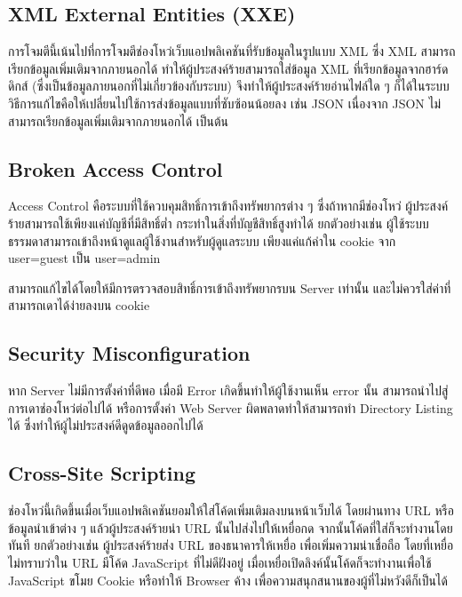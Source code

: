 \subsection{XML External Entities (XXE)}
การโจมตีนี้เน้นไปที่การโจมตีช่องโหว่เว็บแอปพลิเคชันที่รับข้อมูลในรูปแบบ XML \cite{???} ซึ่ง XML สามารถเรียกข้อมูลเพิ่มเติมจากภายนอกได้ ทำให้ผู้ประสงค์ร้ายสามารถใส่ข้อมูล XML ที่เรียกข้อมูลจากฮาร์ดดิกส์ (ซึ่งเป็นข้อมูลภายนอกที่ไม่เกี่ยวข้องกับระบบ) จึงทำให้ผู้ประสงค์ร้ายอ่านไฟล์ใด ๆ ก็ได้ในระบบ \cite{???}
วิธีการแก้ไขคือให้เปลี่ยนไปใช้การส่งข้อมูลแบบที่ซับซ้อนน้อยลง เช่น JSON เนื่องจาก JSON ไม่สามารถเรียกข้อมูลเพิ่มเติมจากภายนอกได้ เป็นต้น

\subsection{Broken Access Control}

Access Control คือระบบที่ใช้ควบคุมสิทธิ์การเข้าถึงทรัพยากรต่าง ๆ ซึ่งถ้าหากมีช่องโหว่ ผู้ประสงค์ร้ายสามารถใช้เพียงแค่บัญชีที่มีสิทธิ์ต่ำ กระทำในสิ่งที่บัญชีสิทธิ์สูงทำได้ ยกตัวอย่างเช่น ผู้ใช้ระบบธรรมดาสามารถเข้าถึงหน้าดูแลผู้ใช้งานสำหรับผู้ดูแลระบบ เพียงแค่แก้ค่าใน cookie จาก user=guest เป็น user=admin

สามารถแก้ไขได้โดยให้มีการตรวจสอบสิทธิ์การเข้าถึงทรัพยากรบน Server เท่านั้น และไม่ควรใส่ค่าที่สามารถเดาได้ง่ายลงบน cookie

\subsection{Security Misconfiguration}
หาก Server ไม่มีการตั้งค่าที่ดีพอ เมื่อมี Error เกิดขึ้นทำให้ผู้ใช้งานเห็น error นั้น สามารถนำไปสู่การเดาช่องโหว่ต่อไปได้ หรือการตั้งค่า Web Server ผิดพลาดทำให้สามารถทำ Directory Listing ได้ \cite{???} ซึ่งทำให้ผู้ไม่ประสงค์ดีดูดข้อมูลออกไปได้

\subsection{Cross-Site Scripting}
ช่องโหว่นี้เกิดขึ้นเมื่อเว็บแอปพลิเคชันยอมให้ใส่โค้ดเพิ่มเติมลงบนหน้าเว็บได้ โดยผ่านทาง URL หรือข้อมูลนำเข้าต่าง ๆ แล้วผู้ประสงค์ร้ายนำ URL นั้นไปส่งไปให้เหยื่อกด จากนั้นโค้ดที่ใส่ก็จะทำงานโดยทันที ยกตัวอย่างเช่น ผู้ประสงค์ร้ายส่ง URL ของธนาคารให้เหยื่อ เพื่อเพิ่มความน่าเชื่อถือ โดยที่เหยื่อไม่ทราบว่าใน URL มีโค้ด JavaScript ที่ไม่ดีฝังอยู่ เมื่อเหยื่อเปิดลิงค์นั้นโค้ดก็จะทำงานเพื่อใช้ JavaScript ขโมย Cookie หรือทำให้ Browser ค้าง เพื่อความสนุกสนานของผู้ที่ไม่หวังดีก็เป็นได้ \cite{???}


